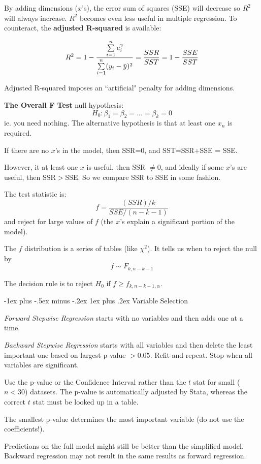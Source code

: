 \documentclass[10pt,landscape]{article}
\makeatletter
\renewcommand{\subsubsection}{\@startsection{subsubsection}{3}{0mm}%
                                {-1ex plus -.5ex minus -.2ex}%
                                {1ex plus .2ex}%
                                {\normalfont\small\bfseries}}
\newcommand{\overbar}[1]{\mkern 1.5mu\overline{\mkern-1.5mu#1\mkern-1.5mu}\mkern 1.5mu}
\makeatother
\begin{document}
\begin{multicols*}{3}
By adding dimensions ($x$'s), the error sum of squares (SSE) will decrease so $R^2$ will always increase. $R^2$ becomes even less useful in multiple regression. To counteract, the \textbf{adjusted R-squared} is available:

\[
R^2 = 1 - \frac{ \sum\limits_{i=1}^n e^2_i} {\sum\limits_{i=1}^n (y_i - \overbar{y})^2} = \frac{SSR}{SST} =  1 - \frac{SSE}{SST}
\]

Adjusted R-squared imposes an ``artificial" penalty for adding dimensions.

\textbf{The Overall F Test} null hypothesis:
\[
H_0 : \beta_1 = \beta_2 = ... = \beta_k = 0
\]
ie. you need nothing. The alternative hypothesis is that at least one $x_n$ is required.

If there are no $x$'s in the model, then SSR=0, and SST=SSR+SSE = SSE.

However, it at least one $x$ is useful, then SSR $\neq 0$, and ideally if some $x$'s are useful, then SSR$>$SSE. So we compare SSR to SSE in some fashion.

The test statistic is:
\[
f = \frac{ (SSR)/k} {SSE/(n-k-1)}
\]
and reject for large values of $f$ (the $x$'s explain a significant portion of the model).

The $f$ distribution is a series of tables (like $\chi^2$). It tells us when to reject the null by
\[
f \sim F_{k,n-k-1}
\]

The decision rule is to reject $H_0$ if $f \geq f_{k, n-k-1, \alpha}$.

\subsubsection{Variable Selection}

\textit{Forward Stepwise Regression} starts with no variables and then adds one at a time.

\textit{Backward Stepwise Regression} starts with all variables and then delete the least important one based on largest p-value $> 0.05$. Refit and repeat. Stop when all variables are significant.

Use the p-value or the Confidence Interval rather than the $t$ stat for small ($n < 30$) datasets. The p-value is automatically adjusted by Stata, whereas the correct $t$ stat must be looked up in a table.

The smallest p-value determines the most important variable (do not use the coefficients!).

Predictions on the full model might still be better than the simplified model. Backward regression may not result in the same results as forward regression.


\end{multicols*}
\end{document}

